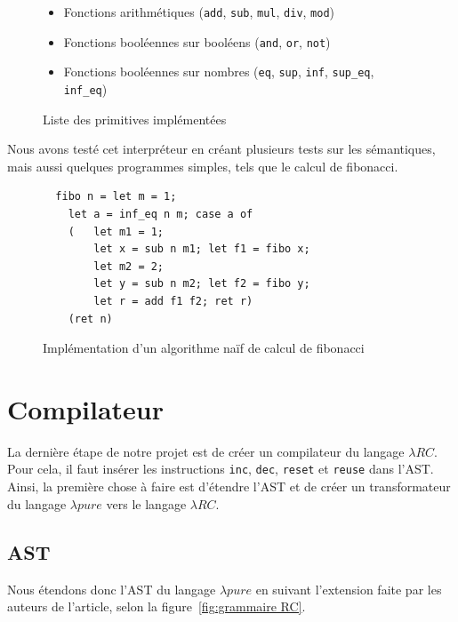 \documentclass{rapportECL}
\begin{document}
\begin{figure}[H]
	\begin{itemize}
		\item Fonctions arithmétiques (\verb|add|, \verb|sub|, \verb|mul|, \verb|div|, \verb|mod|)
		\item Fonctions booléennes sur booléens (\verb|and|, \verb|or|, \verb|not|)
		\item Fonctions booléennes sur nombres (\verb|eq|, \verb|sup|, \verb|inf|, \verb|sup_eq|, \verb|inf_eq|)
	\end{itemize}
	\label{primitives}
	\caption{Liste des primitives implémentées}
\end{figure}

\bigskip

Nous avons testé cet interpréteur en créant plusieurs tests sur les sémantiques, mais aussi quelques programmes simples, 
tels que le calcul de fibonacci.

\begin{figure}[H]
	\begin{lstlisting}
  fibo n = let m = 1;
    let a = inf_eq n m; case a of
    (   let m1 = 1;
        let x = sub n m1; let f1 = fibo x;
        let m2 = 2;
        let y = sub n m2; let f2 = fibo y;
        let r = add f1 f2; ret r)
    (ret n)
	\end{lstlisting}
	\caption{Implémentation d'un algorithme naïf de calcul de fibonacci}
	\label{listing:fibo_naif}
\end{figure}
\FloatBarrier 

\section{Compilateur}

La dernière étape de notre projet est de créer un compilateur du langage $\lambda{RC}$. Pour cela, il faut insérer les 
instructions \verb|inc|, \verb|dec|, \verb|reset| et \verb|reuse| dans l'AST. Ainsi, la première chose à faire est
d'étendre l'AST et de créer un transformateur du langage $\lambda{pure}$ vers le langage $\lambda{RC}$.

\subsection{AST}

Nous étendons donc l'AST du langage $\lambda{pure}$ en suivant l'extension faite par les auteurs de l'article\cite{ullrich_counting_2020},
selon la figure~\ref{fig:grammaire RC}.
\end{document}

